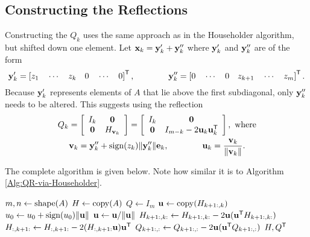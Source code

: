 \subsection*{Constructing the Reflections} %

Constructing the $Q_k$ uses the same approach as in the Householder algorithm, but shifted down one element.
Let $\mathbf{x}_k = \mathbf{y}_k' + \mathbf{y}_k''$ where $\mathbf{y}_k'$ and $\mathbf{y}_k''$ are of the form
\[
\mathbf{y}_k' = \left[z_1\quad \cdots\quad z_k\quad 0\quad \cdots\quad 0\right]^{\mathsf T},
\qquad\qquad
\mathbf{y}_k'' = \left[0\quad\cdots\quad 0\quad z_{k+1}\quad\cdots\quad z_m\right]^{\mathsf T}.
\]
Because $\mathbf{y}_k'$ represents elements of $A$ that lie above the first subdiagonal, only $\mathbf{y}_k''$ needs to be altered.
This suggests using the reflection
\begin{gather*}
Q_k =
\left[\begin{array}{cc}
I_k & \mathbf{0} \\
\mathbf{0}      & H_{\mathbf{v}_k} \\
\end{array}\right] =
\left[\begin{array}{cc}
I_k & \mathbf{0} \\
\mathbf{0}      & I_{m-k} - 2 \mathbf{u}_k\mathbf{u}_k^{\mathsf T} \\
\end{array}\right],\textrm{ where}
\\
\mathbf{v}_k = \mathbf{y}_k'' + \operatorname{sign}(z_k)\|\mathbf{y}_k''\| \mathbf{e}_k,
\qquad\qquad
\mathbf{u}_k = \frac{\mathbf{v}_k}{\|\mathbf{v}_k\|}.
\end{gather*}

The complete algorithm is given below.
Note how similar it is to Algorithm \ref{Alg:QR-via-Householder}.

\begin{algorithm}[H]
\begin{algorithmic}[1]
    \State $m, n \gets \mathrm{shape}(A)$
    \State $H \gets \mathrm{copy}(A)$
    \State $Q \gets I_{m}$
        \State $\mathbf{u} \gets \mathrm{copy}(H_{k+1:,k})$
        \State $u_0 \gets u_0 + \operatorname{sign}(u_0)\|\mathbf{u}\|$
        \State $\mathbf{u} \gets \mathbf{u}/\|\mathbf{u}\|$
        \State $H_{k+1:,k:} \gets H_{k+1:,k:} - 2\mathbf{u}(\mathbf{u}^{\mathsf T} H_{k+1:,k:})$
        \State $H_{:,k+1:} \gets H_{:,k+1:} - 2(H_{:,k+1:} \mathbf{u}) \mathbf{u}^{\mathsf T}$
        \State $Q_{k+1:,:} \gets Q_{k+1:,:} - 2\mathbf{u}(\mathbf{u}^{\mathsf T} Q_{k+1:,:})$
    \EndFor
    \State {} $H, Q^{\mathsf T}$
\EndProcedure
\end{algorithmic}
\caption{}
\label{Alg:Upper-Hessenberg-Form}
\end{algorithm}

